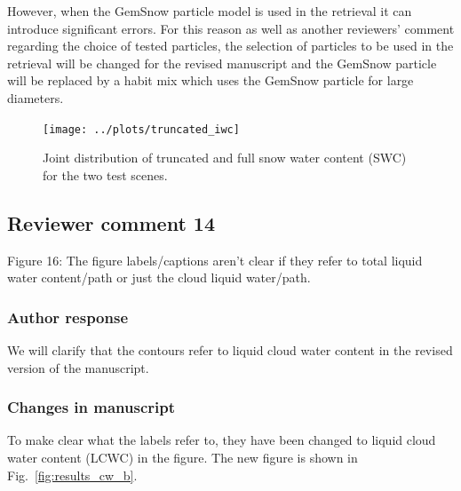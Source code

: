 However, when the GemSnow particle model is used in the retrieval it can
introduce significant errors. For this reason as well as another reviewers'
comment regarding the choice of tested particles, the selection of particles to
be used in the retrieval will be changed for the revised manuscript and the
GemSnow particle will be replaced by a habit mix which uses the GemSnow
particle for large diameters.

\begin{figure}[!hbpt]
  \begin{center}
  \texttt{[image: ../plots/truncated\_iwc]}
  \caption{Joint distribution of truncated and full snow water content (SWC) for the
    two test scenes.}
  \end{center}
\end{figure}

\subsection*{Reviewer comment 14}

Figure 16: The figure labels/captions aren't clear if they refer to total liquid
water content/path or just the cloud liquid water/path.

\subsubsection*{Author response}

We will clarify that the contours refer to liquid cloud water content in the
revised version of the manuscript.

\subsubsection*{Changes in manuscript}

To make clear what the labels refer to, they have been changed to liquid cloud
water content (LCWC) in the figure. The new figure is shown in Fig.~\ref{fig:results_cw_b}.

